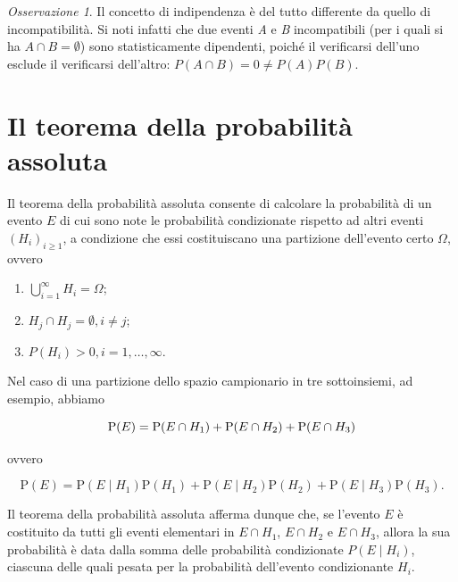 \documentclass[
  11pt,
]{krantz}
\providecommand{\tightlist}{%
  \setlength{\itemsep}{0pt}\setlength{\parskip}{0pt}}
\theoremstyle{definition}
\theoremstyle{definition}
\theoremstyle{definition}
\theoremstyle{definition}
\theoremstyle{remark}
\newtheorem*{remark}{Osservazione}
\begin{document}
\begin{remark}
Il concetto di indipendenza è del tutto differente da quello di incompatibilità. Si noti infatti che due eventi \emph{A} e \emph{B} incompatibili (per i quali si ha \(A \cap B = \emptyset\)) sono statisticamente dipendenti, poiché il verificarsi dell'uno esclude il verificarsi dell'altro: \(P(A \cap B)=0 \neq P(A)P(B)\).
\end{remark}

\hypertarget{il-teorema-della-probabilituxe0-assoluta}{%
\section{Il teorema della probabilità assoluta}\label{il-teorema-della-probabilituxe0-assoluta}}

Il teorema della probabilità assoluta consente di calcolare la probabilità di un evento \(E\) di cui sono note le probabilità condizionate rispetto ad altri eventi \((H_i)_{i\geq 1}\), a condizione che essi costituiscano una partizione dell'evento certo \(\Omega\), ovvero

\begin{enumerate}
\def\labelenumi{\arabic{enumi}.}
\tightlist
\item
  \(\bigcup_{i=1}^\infty H_i = \Omega\);
\item
  \(H_j \cap H_j = \emptyset, i\neq j\);
\item
  \(P(H_i) > 0, i = 1, \dots, \infty\).
\end{enumerate}

Nel caso di una partizione dello spazio campionario in tre sottoinsiemi, ad esempio, abbiamo

\begin{equation}
{\mbox{P}}(E) = {\mbox{P}}(E \cap H_1) + {\mbox{P}}(E \cap H_2) + {\mbox{P}}(E \cap H_3) \notag
\label{eq:prob-total-1a}
\end{equation}

ovvero

\begin{equation}
{\mbox{P}}(E) = {\mbox{P}}(E \mid H_1) {\mbox{P}}(H_1) + {\mbox{P}}(E \mid H_2) {\mbox{P}}(H_2) + {\mbox{P}}(E \mid H_3) {\mbox{P}}(H_3).
\label{eq:prob-total-1b}
\end{equation}

Il teorema della probabilità assoluta afferma dunque che, se l'evento \(E\) è costituito da tutti gli eventi elementari in \(E \cap H_1\), \(E \cap H_2\) e \(E \cap H_3\), allora la sua probabilità è data dalla somma delle probabilità condizionate \(P(E \mid H_i)\), ciascuna delle quali pesata per la probabilità dell'evento condizionante \(H_i\).
\end{document}
